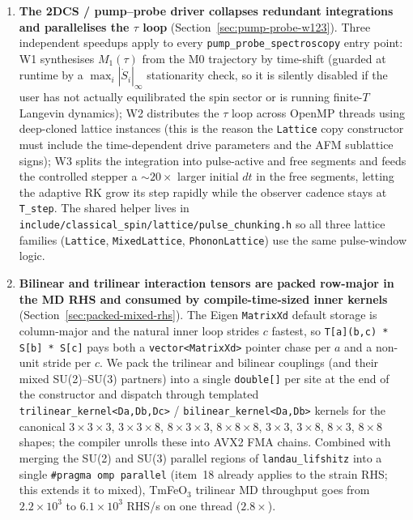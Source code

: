 \documentclass[11pt,letterpaper]{article}
\begin{document}
\begin{enumerate}[itemsep=2pt]
        \texttt{noalias()}, and \texttt{compute\_*\_v3} ME / ring-
        exchange helpers that fuse the eight Eg sub-derivatives
        into one neighbour pass.  This is what removed the
        $\sim 11$ \texttt{malloc/free} pairs per site per RHS that
        had been capping the strain--phonon Langevin integrator.
  \item \textbf{The 2DCS / pump--probe driver collapses redundant
        integrations and parallelises the $\tau$ loop}
        (Section~\ref{sec:pump-probe-w123}).  Three independent
        speedups apply to every \texttt{pump\_probe\_spectroscopy}
        entry point:  W1 synthesises $M_1(\tau)$ from the M0
        trajectory by time-shift (guarded at runtime by a
        $\max_i |\dot S_i|_\infty$ stationarity check, so it is
        silently disabled if the user has not actually equilibrated
        the spin sector or is running finite-$T$ Langevin
        dynamics);  W2 distributes the $\tau$ loop across OpenMP
        threads using deep-cloned lattice instances (this is the
        reason the \texttt{Lattice} copy constructor must include
        the time-dependent drive parameters and the AFM sublattice
        signs);  W3 splits the integration into pulse-active and
        free segments and feeds the controlled stepper a
        $\sim 20\times$ larger initial $dt$ in the free segments,
        letting the adaptive RK grow its step rapidly while the
        observer cadence stays at \texttt{T\_step}.  The shared
        helper lives in
        \texttt{include/classical\_spin/lattice/pulse\_chunking.h}
        so all three lattice families
        (\texttt{Lattice}, \texttt{MixedLattice},
        \texttt{PhononLattice}) use the same pulse-window logic.
  \item \textbf{Bilinear and trilinear interaction tensors are
        packed row-major in the MD RHS and consumed by
        compile-time-sized inner kernels}
        (Section~\ref{sec:packed-mixed-rhs}).  The Eigen
        \texttt{MatrixXd} default storage is column-major and the
        natural inner loop strides $c$ fastest, so
        \texttt{T[a](b,c) * S[b] * S[c]} pays both a
        \texttt{vector<MatrixXd>} pointer chase per $a$ and a
        non-unit stride per $c$.  We pack the trilinear and
        bilinear couplings (and their mixed SU(2)--SU(3) partners)
        into a single \texttt{double[]} per site at the end of
        the constructor and dispatch through templated
        \texttt{trilinear\_kernel<Da,Db,Dc>} /
        \texttt{bilinear\_kernel<Da,Db>} kernels for the canonical
        $3\times3\times3$, $3\times3\times8$, $8\times3\times3$,
        $8\times8\times8$, $3\times3$, $3\times8$, $8\times3$,
        $8\times8$ shapes; the compiler unrolls these into AVX2
        FMA chains.  Combined with merging the SU(2) and SU(3)
        parallel regions of \texttt{landau\_lifshitz} into a
        single \texttt{\#pragma omp parallel} (item~18 already
        applies to the strain RHS; this extends it to mixed),
        TmFeO$_3$ trilinear MD throughput goes from
        $2.2 \times 10^{3}$ to $6.1 \times 10^{3}$ RHS/s on one
        thread ($\mathbf{2.8\times}$).
\end{enumerate}
\end{document}
